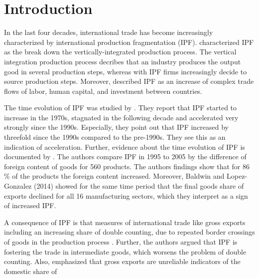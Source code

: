 \chapter{Introduction}
\label{cha:Intro}
In the last four decades, international trade has become increasingly characterized by international production fragmentation (IPF).
\textcite{feenstra98} characterized IPF as the break down the vertically-integrated production process.
The vertical integration production process decribes that an industry produces the output good in several production steps, whereas with IPF firms increasingly decide to source production steps.
Moreover, \textcite{baldwin2014}  described IPF as an increase of complex trade flows of labor, human capital, and investment between countries. \par
 The time evolution of IPF was studied by \textcite{Johnson2012}.
They report that IPF started to increase in the 1970s, stagnated in the following decade and accelerated very strongly since the 1990s.
Especially, they point out that IPF increased by threefold since the 1990s compared to the pre-1990s.
They see this as an indication of acceleration.
Further, evidence about the time evolution of IPF is documented by \textcite{timmer_gvc}. The authors compare IPF in 1995 to 2005 by the difference of foreign content of goods for 560 products.
The authors findings show that for 86 \% of the products the foreign content increased.
Moreover, Baldwin and Lopez-Gonzalez (2014) showed for the same time period that the final goods share of exports declined for all 16 manufacturing sectors, which they interpret as a sign of increased IPF.
\par %
A consequence of IPF is that measures of international trade like gross exports including an increasing share of double counting, due to repeated border crossings of goods in the production process \parencite{feenstra98}.
Further, the authors argued that IPF is fostering the trade in intermediate goods, which worsens the problem of double counting.
Also, \textcite{johnson}  emphasized that gross exports are unreliable indicators of the domestic share of

